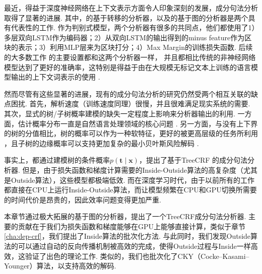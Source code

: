 最近，得益于深度神经网络在上下文表示方面令人印象深刻的发展，成分句法分析取得了显著的进展.
其中，\cite{cross-huang-2016-span}的基于转移的分析器，以及\cite{stern-etal-2017-minimal}的基于图的分析器是两个具有代表性的工作.
作为判别式模型，两个分析器有很多的共同点，他们都使用了1）多层双向LSTM作为编码器；2）从双向LSTM的输出得到的minus feature作为区块的表示；3）利用MLP层来为区块打分；4）Max Margin的训练损失函数.
后续的大多数工作 \citep{gaddy-etal-2018-whats,kitaev-klein-2018-constituency}的主要设置都和这两个分析器一样， 并且都相比传统的非神经网络模型达到了更好的准确率，这特别是得益于由在大规模无标记文本上训练的语言模型输出的上下文词表示的使用 \citep{peters-etal-2018-deep,devlin-etal-2019-bert}.

然而尽管有这些显著的进展，现有的成分句法分析的研究仍然受两个相互关联的缺点困扰.
首先，解析速度（训练速度同理）很慢，并且很难满足现实系统的需要.
其次，显式的树/子树概率建模的缺失一定程度上影响来分析器输出的利用.
一方面，估计概率分布一直是自然语言处理领域的核心问题 \citep{le-zuidema-2014-inside}.
另一方面，与没有上下界的树的分值相比，树的概率可以作为一种软特征，更好的被更高层级的任务所利用 \citep{jin-etal-2020-relation}，且子树的边缘概率可以支持更加复杂的最小贝叶斯风险解码 \citep{smith-smith-2007-probabilistic}.

事实上，\cite{finkel-etal-2008-efficient,durrett-klein-2015-neural}都通过建模树的条件概率$p(\boldsymbol{t}\mid\boldsymbol{x})$，提出了基于TreeCRF \citep{lafferty-etal-2001-crf}的成分句法分析器.
但是，由于损失函数和梯度计算需要的Inside-Outside算法的高复杂度（尤其是Outside算法），这些模型都极端低效.
而在深度学习时代，由于以前所有的工作都直接在CPU上运行Inside-Outside算法，而让模型频繁在CPU和GPU切换所需要的时间代价是昂贵的，因此效率问题变得更加严重.

本章节通过极大拓展\cite{stern-etal-2017-minimal}的基于图的分析器，提出了一个TreeCRF成分句法分析器.
主要的贡献在于我们为损失函数和梯度能够在GPU上能够直接计算，类似于章节\ref{cha:dep-crf}，我们提出了Inside算法的批次化方法.
与此同时，我们发现Outside算法的可以通过自动的反向传播机制被高效的完成，使得Outside过程与Inside一样高效，这验证了\cite{eisner-2016-inside}出色的理论工作.
类似的，我们也批次化了CKY（Cocke–Kasami–Younger）算法，以支持高效的解码.


